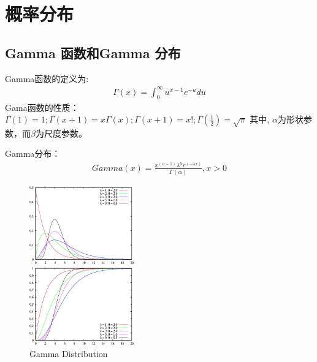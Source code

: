
\chapter{概率分布}
\section{Gamma 函数和Gamma 分布}
Gamma函数的定义为:
\begin{displaymath}
\begin{split}
\Gamma(x)=\int_{0}^{\infty}{u^{x-1}e^{-u}du}
\end{split}
\end{displaymath}
Gama函数的性质：
$\Gamma(1)=1; \Gamma(x+1)=x\Gamma(x); \Gamma(x+1) = x!; \Gamma(\frac{1}{2}) = \sqrt{\pi}$
其中, $\alpha$为形状参数，而$\beta$为尺度参数。

Gamma分布：
\begin{displaymath}
\begin{split}
Gamma(x) = \frac{x^{(\alpha-1)} \lambda^\alpha e^{(-\lambda x)}}{\Gamma(\alpha)}, x > 0
\end{split}
\end{displaymath}

\begin{figure}[htbp]
\centering
\begin{subfloat}
\centering
\includegraphics[width = 0.4\textwidth]{figures/Gamma_distribution_pdf.jpg}
\end{subfloat}
\begin{subfloat}
\centering
\includegraphics[width = 0.4\textwidth]{figures/Gamma_distribution_cdf.jpg}
\end{subfloat}
\caption{Gamma Distribution}
\end{figure}

